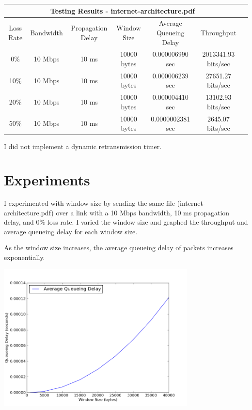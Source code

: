 \documentclass[11pt]{article}
\begin{document}
\begin{center}
\begin{tabular}{ c c c c c c c }
  \multicolumn{6}{c}{Testing Results - internet-architecture.pdf} \\
  \hline
  {\tiny Loss Rate} & {\tiny Bandwidth} & {\tiny Propagation Delay} & {\tiny Window Size} & {\tiny Average Queueing Delay} & {\tiny Throughput}\\
  0\% & 10 Mbps & 10 ms & 10000 bytes & 0.000006990 sec & 2013341.93 bits/sec \\
  10\% & 10 Mbps & 10 ms & 10000 bytes & 0.000006239 sec & 27651.27 bits/sec \\
  20\% & 10 Mbps & 10 ms & 10000 bytes & 0.000004410 sec & 13102.93 bits/sec \\
  50\% & 10 Mbps & 10 ms & 10000 bytes & 0.0000002381 sec & 2645.07 bits/sec \\
\end{tabular}
\end{center}

\vspace{0.5cm}
I did not implement a dynamic retransmission timer.
\vspace{0.5cm}

\section{Experiments}
I experimented with window size by sending the same file (internet-architecture.pdf) over a link with a 10 Mbps bandwidth, 10 ms propagation delay, and 0\% loss rate. I varied the window size and graphed the throughput and average queueing delay for each window size. 

As the window size increases, the average queueing delay of packets increases exponentially.
\begin{center}
\includegraphics[width=10cm]{../delay.png}
\end{center}
\end{document}
